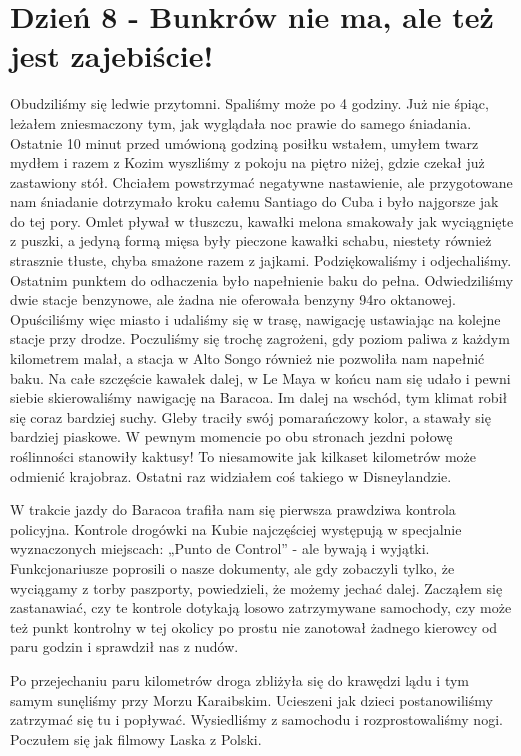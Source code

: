 
\chapter[Bunkrów nie ma, ale też jest zajebiście!]{Dzień 8 - Bunkrów nie ma, ale też jest zajebiście!}

Obudziliśmy się ledwie przytomni.
Spaliśmy może po 4 godziny.
Już nie śpiąc, leżałem zniesmaczony tym, jak wyglądała noc prawie do samego śniadania.
Ostatnie 10 minut przed umówioną godziną posiłku wstałem, umyłem twarz mydłem i razem z Kozim wyszliśmy z pokoju na piętro niżej, gdzie czekał już zastawiony stół.
Chciałem powstrzymać negatywne nastawienie, ale przygotowane nam śniadanie dotrzymało kroku całemu Santiago do Cuba i było najgorsze jak do tej pory.
Omlet pływał w tłuszczu, kawałki melona smakowały jak wyciągnięte z puszki, a jedyną formą mięsa były pieczone kawałki schabu, niestety również strasznie tłuste, chyba smażone razem z jajkami.
Podziękowaliśmy i odjechaliśmy.
Ostatnim punktem do odhaczenia było napełnienie baku do pełna.
Odwiedziliśmy dwie stacje benzynowe, ale żadna nie oferowała benzyny 94ro oktanowej.
Opuściliśmy więc miasto i udaliśmy się w trasę, nawigację ustawiając na kolejne stacje przy drodze.
Poczuliśmy się trochę zagrożeni, gdy poziom paliwa z każdym kilometrem malał, a stacja w Alto Songo również nie pozwoliła nam napełnić baku.
Na całe szczęście kawałek dalej, w Le Maya w końcu nam się udało i pewni siebie skierowaliśmy nawigację na Baracoa.
Im dalej na wschód, tym klimat robił się coraz bardziej suchy.
Gleby traciły swój pomarańczowy kolor, a stawały się bardziej piaskowe.
W pewnym momencie po obu stronach jezdni połowę roślinności stanowiły kaktusy!
To niesamowite jak kilkaset kilometrów może odmienić krajobraz.
Ostatni raz widziałem coś takiego w Disneylandzie.
\par W trakcie jazdy do Baracoa trafiła nam się pierwsza prawdziwa kontrola policyjna.
Kontrole drogówki na Kubie najczęściej występują w specjalnie wyznaczonych miejscach: „Punto de Control” - ale bywają i wyjątki.
Funkcjonariusze poprosili o nasze dokumenty, ale gdy zobaczyli tylko, że wyciągamy z torby paszporty, powiedzieli, że możemy jechać dalej.
Zacząłem się zastanawiać, czy te kontrole dotykają losowo zatrzymywane samochody, czy może też punkt kontrolny w tej okolicy po prostu nie zanotował żadnego kierowcy od paru godzin i sprawdził nas z nudów.
\par Po przejechaniu paru kilometrów droga zbliżyła się do krawędzi lądu i tym samym sunęliśmy przy Morzu Karaibskim.
Ucieszeni jak dzieci postanowiliśmy zatrzymać się tu i popływać.
Wysiedliśmy z samochodu i rozprostowaliśmy nogi.
Poczułem się jak filmowy Laska z Polski.

